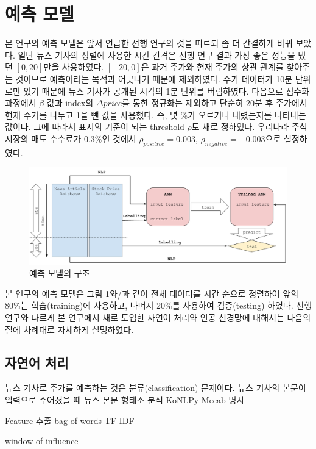 \documentclass[a4paper,10pt]{article}
\begin{document}
\section{예측 모델}

본 연구의 예측 모델은 앞서 언급한 선행 연구의 것을 따르되 좀 더 간결하게 바꿔 보았다.
일단 뉴스 기사의 정렬에 사용한 시간 간격은 선행 연구 결과 가장 좋은 성능을 냈던 $[0, 20]$만을 사용하였다.
$[-20, 0]$은 과거 주가와 현재 주가의 상관 관계를 찾아주는 것이므로 예측이라는 목적과 어긋나기 때문에 제외하였다.
주가 데이터가 10분 단위로만 있기 때문에 뉴스 기사가 공개된 시각의 1분 단위를 버림하였다.
다음으로 점수화 과정에서 $\beta$-값과 index의 $\Delta price$를 통한 정규화는 제외하고 단순히 20분 후 주가에서 현재 주가를 나누고 1을 뺀 값을 사용했다.
즉, 몇 \%가 오르거나 내렸는지를 나타내는 값이다.
그에 따라서 표지의 기준이 되는 threshold $\rho$도 새로 정하였다.
우리나라 주식 시장의 매도 수수료가 $0.3\%$인 것에서 $\rho_{positive}=0.003$, $\rho_{negative}=-0.003$으로 설정하였다.

\begin{figure}[h]
\includegraphics[width=\textwidth]{model}
\centering
\caption{예측 모델의 구조}
\label{fig:model}
\end{figure}
본 연구의 예측 모델은 그림 \ref{fig:model}와/과 같이 전체 데이터를 시간 순으로 정렬하여
앞의 80\%는 학습(training)에 사용하고, 나머지 20\%를 사용하여 검증(testing) 하였다.
선행 연구와 다르게 본 연구에서 새로 도입한 자연어 처리와 인공 신경망에 대해서는 다음의 절에 차례대로 자세하게 설명하였다.

\subsection{자연어 처리}

뉴스 기사로 주가를 예측하는 것은 분류(classification) 문제이다.
뉴스 기사의 본문이 입력으로 주어졌을 때 
뉴스 본문
형태소 분석
KoNLPy
Mecab
명사

Feature 추출
bag of words
TF-IDF

window of influence
\end{document}
